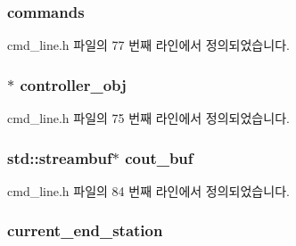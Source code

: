 \subsubsection[{\texorpdfstring{commands}{commands}}]{ commands\hspace{0.3cm}{\ttfamily [private]}}\hypertarget{classcmd__line_ae4fea670c2fdd2b60f7b5b6ad6fbaf1e}{}\label{classcmd__line_ae4fea670c2fdd2b60f7b5b6ad6fbaf1e}


cmd\+\_\+line.\+h 파일의 77 번째 라인에서 정의되었습니다.

\subsubsection[{\texorpdfstring{controller\+\_\+obj}{controller_obj}}]{$\ast$ controller\+\_\+obj\hspace{0.3cm}{\ttfamily [private]}}\hypertarget{classcmd__line_af0a7784509e5bf1210a2aa19cea5df70}{}\label{classcmd__line_af0a7784509e5bf1210a2aa19cea5df70}


cmd\+\_\+line.\+h 파일의 75 번째 라인에서 정의되었습니다.

\subsubsection[{\texorpdfstring{cout\+\_\+buf}{cout_buf}}]{\setlength{\rightskip}{0pt plus 5cm}std\+::streambuf$\ast$ cout\+\_\+buf\hspace{0.3cm}{\ttfamily [private]}}\hypertarget{classcmd__line_a4577b8eb2d0b1e99d72ef9a40e6c8d01}{}\label{classcmd__line_a4577b8eb2d0b1e99d72ef9a40e6c8d01}


cmd\+\_\+line.\+h 파일의 84 번째 라인에서 정의되었습니다.

\subsubsection[{\texorpdfstring{current\+\_\+end\+\_\+station}{current_end_station}}]{ current\+\_\+end\+\_\+station\hspace{0.3cm}{\ttfamily [private]}}\hypertarget{classcmd__line_a67c43393f654ad7bc5c7caf29634cede}{}\label{classcmd__line_a67c43393f654ad7bc5c7caf29634cede}


